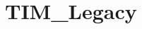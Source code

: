 \hypertarget{group___t_i_m___legacy}{\section{T\-I\-M\-\_\-\-Legacy}
\label{group___t_i_m___legacy}
}
